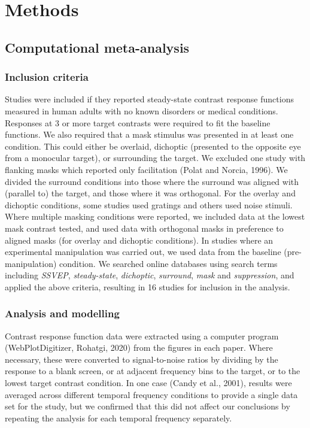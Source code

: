 \documentclass[]{article}
\begin{document}
\hypertarget{methods}{%
\section{Methods}\label{methods}}

\hypertarget{computational-meta-analysis}{%
\subsection{Computational meta-analysis}\label{computational-meta-analysis}}

\hypertarget{inclusion-criteria}{%
\subsubsection{Inclusion criteria}\label{inclusion-criteria}}

Studies were included if they reported steady-state contrast response functions measured in human adults with no known disorders or medical conditions. Responses at 3 or more target contrasts were required to fit the baseline functions. We also required that a mask stimulus was presented in at least one condition. This could either be overlaid, dichoptic (presented to the opposite eye from a monocular target), or surrounding the target. We excluded one study with flanking masks which reported only facilitation (Polat and Norcia, 1996). We divided the surround conditions into those where the surround was aligned with (parallel to) the target, and those where it was orthogonal. For the overlay and dichoptic conditions, some studies used gratings and others used noise stimuli. Where multiple masking conditions were reported, we included data at the lowest mask contrast tested, and used data with orthogonal masks in preference to aligned masks (for overlay and dichoptic conditions). In studies where an experimental manipulation was carried out, we used data from the baseline (pre-manipulation) condition. We searched online databases using search terms including \emph{SSVEP}, \emph{steady-state}, \emph{dichoptic}, \emph{surround}, \emph{mask} and \emph{suppression}, and applied the above criteria, resulting in 16 studies for inclusion in the analysis.

\hypertarget{analysis-and-modelling}{%
\subsubsection{Analysis and modelling}\label{analysis-and-modelling}}

Contrast response function data were extracted using a computer program (WebPlotDigitizer, Rohatgi, 2020) from the figures in each paper. Where necessary, these were converted to signal-to-noise ratios by dividing by the response to a blank screen, or at adjacent frequency bins to the target, or to the lowest target contrast condition. In one case (Candy et al., 2001), results were averaged across different temporal frequency conditions to provide a single data set for the study, but we confirmed that this did not affect our conclusions by repeating the analysis for each temporal frequency separately.
\end{document}
